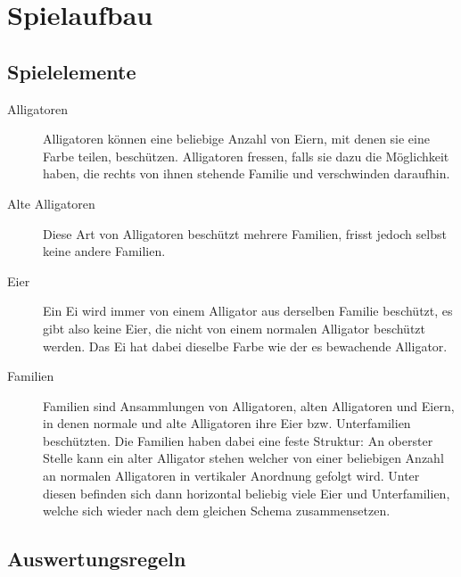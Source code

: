 \section{Spielaufbau}

\subsection{Spielelemente}

	\begin{description}
		\item[Alligatoren] Alligatoren können eine beliebige Anzahl von Eiern, mit denen sie eine Farbe teilen, beschützen.
		Alligatoren fressen, falls sie dazu die Möglichkeit haben, die rechts von ihnen stehende Familie und verschwinden daraufhin.

		\item[Alte Alligatoren] Diese Art von Alligatoren beschützt mehrere Familien, frisst jedoch selbst keine andere Familien.

		\item[Eier] Ein Ei wird immer von einem Alligator aus derselben Familie beschützt, es gibt also keine Eier, die nicht von einem normalen Alligator beschützt werden.
		Das Ei hat dabei dieselbe Farbe wie der es bewachende Alligator.

		\item[Familien] Familien sind Ansammlungen von Alligatoren, alten Alligatoren und Eiern, in denen normale und alte Alligatoren ihre Eier bzw. Unterfamilien beschützten.
		Die Familien haben dabei eine feste Struktur: An oberster Stelle kann ein alter Alligator stehen welcher von einer beliebigen Anzahl an normalen Alligatoren in vertikaler Anordnung gefolgt wird.
		Unter diesen befinden sich dann horizontal beliebig viele Eier und Unterfamilien, welche sich wieder nach dem gleichen Schema zusammensetzen.

	\end{description}

\subsection{Auswertungsregeln}

